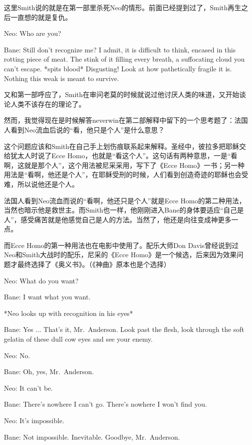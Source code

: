 \documentclass[UTF8]{ctexart}
\newenvironment{myquote}{\color{green} \setlength{\leftskip}{6em} \setlength{\rightskip}{4em} \setlength{\parindent}{-2em}}{\par}
\begin{document}
这里Smith说的就是在第一部里杀死Neo的情形。前面已经提到过了，Smith再生之后一直想的就是复仇。

\begin{myquote}
Neo: Who are you?

Bane: Still don't recognize me? I admit, it is difficult to think, encased in this rotting piece of meat. The stink of it filling every breath, a suffocating cloud you can't escape. *spits blood* Disgusting! Look at how pathetically fragile it is. Nothing this weak is meant to survive.
\end{myquote}

又和第一部呼应了，Smith在审问老莫的时候就说过他讨厌人类的味道，又开始谈论人类不该存在的理论了。

然而，我觉得现在是时候解答neverwin在第二部解释中留下的一个思考题了：法国人看到Neo流血后说的“看，他只是个人”是什么意思？

这个问题应该和Smith在自己手上划伤痕联系起来解释。圣经中，彼拉多把耶稣交给犹太人时说了Ecce Homo，也就是“看这个人”。这句话有两种意思，一是“看啊，这就是那个人”，这个用法被尼采采用，写下了《Ecce Homo》一书；另一种用法是“看啊，他还是个人”，在耶稣受刑的时候，人们看到创造奇迹的耶稣也会受难，所以说他还是个人。

法国人看到Neo流血而说的“看啊，他还只是个人”就是Ecce Homo的第二种用法，当然也暗示他是救世主。而Smith也一样，他刚刚进入Bane的身体要适应“自己是人”，感受痛苦就是他感觉自己是人的方法。当然了，他还是向往变成神更多一点。

而Ecce Homo的第一种用法也在电影中使用了。配乐大师Don Davis曾经说到过Neo和Smith大战时的配乐，尼采的《Ecce Homo》是一个候选，后来因为效果问题才最终选择了《奥义书》。（《神曲》原本也是个选择）

\begin{myquote}
Neo: What do you want?

Bane: I want what you want.

*Neo looks up with recognition in his eyes*

Bane: Yes ... That's it, Mr.~Anderson. Look past the flesh, look through the soft gelatin of these dull cow eyes and see your enemy.

Neo: No.

Bane: Oh, yes, Mr.~Anderson.

Neo: It can't be.

Bane: There's nowhere I can't go. There's nowhere I won't find you.

Neo: It's impossible.

Bane: Not impossible. Inevitable. Goodbye, Mr.~Anderson.
\end{myquote}
\end{document}
